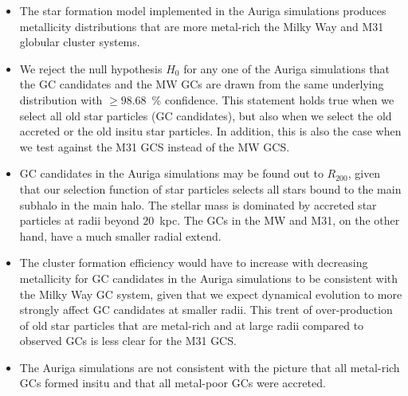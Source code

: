 \documentclass[a4paper,fleqn,usenatbib]{mnras}
\begin{document}
\begin{itemize}
    \item The star formation model implemented in the Auriga simulations produces
    metallicity distributions that are more metal-rich the Milky Way and M31
    globular cluster systems.

    \item We reject the null hypothesis $H_0$ for any one of the Auriga simulations 
    that the GC candidates and the MW GCs are drawn from the same underlying 
    distribution with $\geq 98.68$~\% confidence. This statement holds true when
    we select all old star particles (GC candidates), but also when we select the 
    old accreted or the old insitu star particles. In addition, this is also
    the case when we test against the M31 GCS instead of the MW GCS.

    \item GC candidates in the Auriga simulations may be found out to $R_{200}$,
    given that our selection function of star particles selects all stars bound
    to the main subhalo in the main halo. The stellar mass is dominated by accreted 
    star particles at radii beyond $20$~kpc. The GCs in the MW and M31, on the 
    other hand, have a much smaller radial extend.

    \item The cluster formation efficiency would have to increase with decreasing
    metallicity for GC candidates in the Auriga simulations to be consistent
    with the Milky Way GC system, given that we expect dynamical evolution to 
    more strongly affect GC candidates at smaller radii. This trent of over-production
    of old star particles that are metal-rich and at large radii compared to 
    observed GCs is less clear for the M31 GCS.

    \item The Auriga simulations are not consistent with the picture that all
    metal-rich GCs formed insitu and that all metal-poor GCs were accreted.

\end{itemize}
\end{document}
